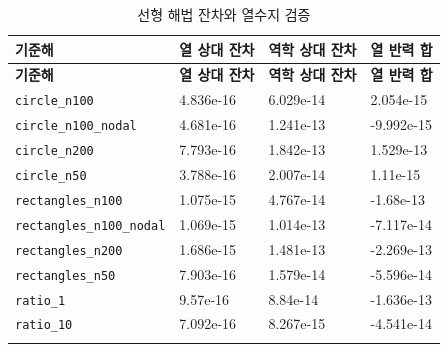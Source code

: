 \documentclass[10pt,a4paper]{article}
\begin{document}
\begin{longtable}{>{\raggedright\arraybackslash}p{}>{\raggedright\arraybackslash}p{}>{\raggedright\arraybackslash}p{}>{\raggedright\arraybackslash}p{}}

\caption{선형 해법 잔차와 열수지 검증}\\

\rowcolor{tint} \textbf{기준해} & \textbf{열 상대 잔차} & \textbf{역학 상대 잔차} & \textbf{열 반력 합}\\\midrule\endfirsthead

\rowcolor{tint} \textbf{기준해} & \textbf{열 상대 잔차} & \textbf{역학 상대 잔차} & \textbf{열 반력 합}\\\midrule\endhead

\bottomrule\endfoot

\nolinkurl{circle_n100} & 4.836e-16 & 6.029e-14 & 2.054e-15\\\addlinespace[1pt]

\nolinkurl{circle_n100_nodal} & 4.681e-16 & 1.241e-13 & -9.992e-15\\\addlinespace[1pt]

\nolinkurl{circle_n200} & 7.793e-16 & 1.842e-13 & 1.529e-13\\\addlinespace[1pt]

\nolinkurl{circle_n50} & 3.788e-16 & 2.007e-14 & 1.11e-15\\\addlinespace[1pt]

\nolinkurl{rectangles_n100} & 1.075e-15 & 4.767e-14 & -1.68e-13\\\addlinespace[1pt]

\nolinkurl{rectangles_n100_nodal} & 1.069e-15 & 1.014e-13 & -7.117e-14\\\addlinespace[1pt]

\nolinkurl{rectangles_n200} & 1.686e-15 & 1.481e-13 & -2.269e-13\\\addlinespace[1pt]

\nolinkurl{rectangles_n50} & 7.903e-16 & 1.579e-14 & -5.596e-14\\\addlinespace[1pt]

\nolinkurl{ratio_1} & 9.57e-16 & 8.84e-14 & -1.636e-13\\\addlinespace[1pt]

\nolinkurl{ratio_10} & 7.092e-16 & 8.267e-15 & -4.541e-14\\\addlinespace[1pt]


\end{longtable}
\end{document}
